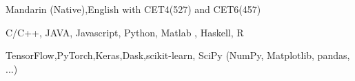 
\begin{cvtbl}
        {Mandarin (Native),English with CET4(527) and CET6(457)}%

        {C/C++, JAVA, Javascript, Python, Matlab , Haskell, R}

        {TensorFlow,PyTorch,Keras,Dask,scikit-learn, SciPy (NumPy, Matplotlib, pandas, ...)}
\end{cvtbl}

\endinput